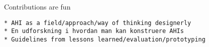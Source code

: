 Contributions are fun

\begin{verbatim}
* AHI as a field/approach/way of thinking designerly
* En udforskning i hvordan man kan konstruere AHIs
* Guidelines from lessons learned/evaluation/prototyping
\end{verbatim}